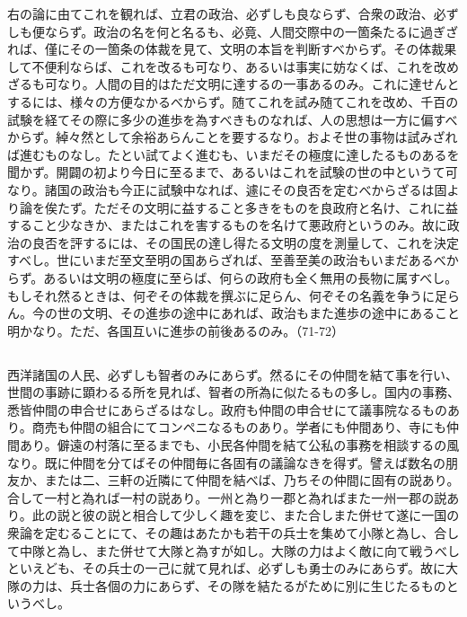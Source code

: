 右の論に由てこれを観れば、立君の政治、必ずしも良ならず、合衆の政治、必ずしも便ならず。政治の名を何と名るも、必竟、人間交際中の一箇条たるに過ぎざれば、僅にその一箇条の体裁を見て、文明の本旨を判断すべからず。その体裁果して不便利ならば、これを改るも可なり、あるいは事実に妨なくば、これを改めざるも可なり。人間の目的はただ文明に達するの一事あるのみ。これに達せんとするには、様々の方便なかるべからず。随てこれを試み随てこれを改め、千百の試験を経てその際に多少の進歩を為すべきものなれば、人の思想は一方に偏すべからず。綽々然として余裕あらんことを要するなり。およそ世の事物は試みざれば進むものなし。たとい試てよく進むも、いまだその極度に達したるものあるを聞かず。開闢の初より今日に至るまで、あるいはこれを試験の世の中というて可なり。諸国の政治も今正に試験中なれば、遽にその良否を定むべからざるは固より論を俟たず。ただその文明に益すること多きをものを良政府と名け、これに益すること少なきか、またはこれを害するものを名けて悪政府というのみ。故に政治の良否を評するには、その国民の達し得たる文明の度を測量して、これを決定すべし。世にいまだ至文至明の国あらざれば、至善至美の政治もいまだあるべからず。あるいは文明の極度に至らば、何らの政府も全く無用の長物に属すべし。もしそれ然るときは、何ぞその体裁を撰ぶに足らん、何ぞその名義を争うに足らん。今の世の文明、その進歩の途中にあれば、政治もまた進歩の途中にあること明かなり。ただ、各国互いに進歩の前後あるのみ。（71-72）

\subsection{}
\label{sec:4}



西洋諸国の人民、必ずしも智者のみにあらず。然るにその仲間を結て事を行い、世間の事跡に顕わるる所を見れば、智者の所為に似たるもの多し。国内の事務、悉皆仲間の申合せにあらざるはなし。政府も仲間の申合せにて議事院なるものあり。商売も仲間の組合にてコンペニなるものあり。学者にも仲間あり、寺にも仲間あり。僻遠の村落に至るまでも、小民各仲間を結て公私の事務を相談するの風なり。既に仲間を分てばその仲間毎に各固有の議論なきを得ず。譬えば数名の朋友か、または二、三軒の近隣にて仲間を結べば、乃ちその仲間に固有の説あり。合して一村と為れば一村の説あり。一州と為り一郡と為ればまた一州一郡の説あり。此の説と彼の説と相合して少しく趣を変じ、また合しまた併せて遂に一国の衆論を定むることにて、その趣はあたかも若干の兵士を集めて小隊と為し、合して中隊と為し、また併せて大隊と為すが如し。大隊の力はよく敵に向て戦うべしといえども、その兵士の一己に就て見れば、必ずしも勇士のみにあらず。故に大隊の力は、兵士各個の力にあらず、その隊を結たるがために別に生じたるものというべし。

